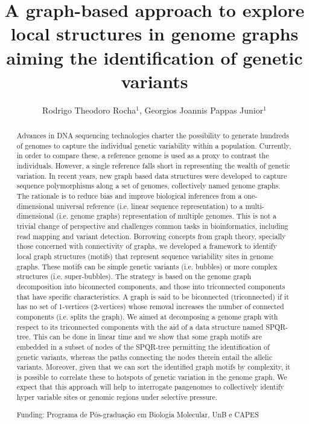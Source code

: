 \documentclass[twoside]{article}
\title{\vspace{-15mm}\fontsize{24pt}{10pt}\selectfont\textbf{A graph-based approach to explore local structures in genome graphs aiming the identification of genetic variants}} %
\author{Rodrigo Theodoro Rocha$^1$, Georgios Joannis Pappas Junior$^1$}
\affil{1 DEPARTAMENTO DE BIOLOGIA CELULAR, INSTITUTO DE CI\^ENCIAS BIOL\'OGICAS, UNB\\ }
\date{}
\begin{document}
\maketitle %

\thispagestyle{fancy} %


\begin{abstract}
Advances in DNA sequencing technologies charter the possibility to generate hundreds of genomes to capture the individual genetic variability within a population. Currently, in order to compare these, a reference genome is used as a proxy to contrast the individuals. However, a single reference falls short in representing the wealth of genetic variation. In recent years, new graph based data structures were developed to capture sequence polymorphisms along a set of genomes, collectively named genome graphs. The rationale is to reduce bias and improve biological inferences from a one-dimensional universal reference (i.e. linear sequence representation) to a multi-dimensional (i.e. genome graphs) representation of multiple genomes. This is not a trivial change of perspective and challenges common tasks in bioinformatics, including read mapping and variant detection.  Borrowing concepts from graph theory, specially those concerned with connectivity of graphs, we developed a framework to identify local graph structures (motifs) that represent sequence variability sites in genome graphs. These motifs can be simple genetic variants (i.e. bubbles) or more complex structures (i.e. super-bubbles). The strategy is based on the genome graph decomposition into biconnected components, and those into triconnected components that have specific characteristics. A graph is said to be biconnected (triconnected) if it has no set of 1-vertices (2-vertices) whose removal increases the number of connected components (i.e. splits the graph). 
We aimed at decomposing a genome graph with respect to its triconnected components with the aid of a data structure named SPQR-tree. This can be done in linear time and we show that some graph motifs are embedded in a subset of nodes of the SPQR-tree permitting the identification of genetic variants, whereas the paths connecting the nodes therein entail the allelic variants. Moreover, given that we can sort the identified graph motifs by complexity, it is possible to correlate these to hotspots of genetic variation in the genome graph. We expect that this approach will help to interrogate pangenomes to collectively identify hyper variable sites or genomic regions under selective pressure.

Funding: Programa de P\'os-gradua\c{c}\~ao em Biologia Molecular, UnB e CAPES
\end{abstract}
\end{document}
